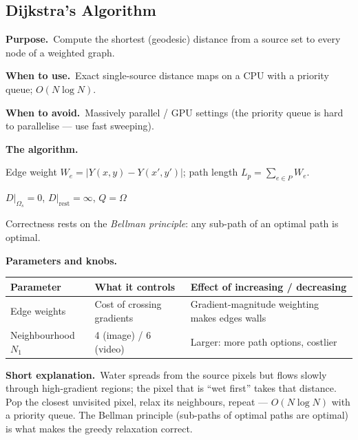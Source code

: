 \documentclass[10pt]{article}
\makeatletter
\newcommand{\Purpose}{\par\smallskip\textbf{Purpose.}\ }
\newcommand{\WhenUse}{\par\textbf{When to use.}\ }
\newcommand{\WhenAvoid}{\par\textbf{When to avoid.}\ }
\newcommand{\TheAlgo}{\par\smallskip\textbf{The algorithm.}\par\nopagebreak}
\newcommand{\Knobs}{\par\smallskip\textbf{Parameters and knobs.}\par\nopagebreak}
\newcommand{\ShortExp}{\par\smallskip\textbf{Short explanation.}\ }
\newenvironment{ptable}{\begin{center}\small\begin{tabular}{@{}p{2.5cm} p{5.9cm} p{6.2cm}@{}}\toprule
Parameter & What it controls & Effect of increasing / decreasing \\ \midrule}
{\bottomrule\end{tabular}\end{center}}
\makeatother
\begin{document}
\subsection{Dijkstra's Algorithm}\label{sub:dijkstra}
\Purpose Compute the shortest (geodesic) distance from a source set to every node of a weighted graph.
\WhenUse Exact single-source distance maps on a CPU with a priority queue; $O(N\log N)$.
\WhenAvoid Massively parallel / GPU settings (the priority queue is hard to parallelise --- use fast
sweeping).
\TheAlgo Edge weight $W_e=|Y(x,y)-Y(x',y')|$; path length $L_p=\sum_{e\in P}W_e$.

\begin{algorithm}[H]
\SetAlgoLined
{}
$D|_{\Omega_s}=0$, $D|_{\text{rest}}=\infty$, $Q=\Omega$\;
\caption{Dijkstra (geodesic distance)}
\end{algorithm}
Correctness rests on the \emph{Bellman principle}: any sub-path of an optimal path is optimal.

\Knobs
\begin{ptable}
Edge weights & Cost of crossing gradients & Gradient-magnitude weighting makes edges walls \\
Neighbourhood $N_1$ & 4 (image) / 6 (video) & Larger: more path options, costlier \\
\end{ptable}
\ShortExp Water spreads from the source pixels but flows slowly through high-gradient regions; the pixel
that is ``wet first'' takes that distance. Pop the closest unvisited pixel, relax its neighbours, repeat ---
$O(N\log N)$ with a priority queue. The Bellman principle (sub-paths of optimal paths are optimal) is what
makes the greedy relaxation correct.

\end{document}
